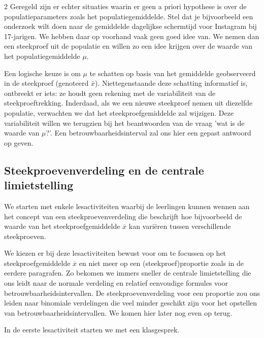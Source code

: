 \begin{multicols}{2}
Geregeld zijn er echter situaties waarin er geen a priori hypothese is over de populatieparameters zoals het populatiegemiddelde. Stel dat je bijvoorbeeld een onderzoek wilt doen naar de gemiddelde dagelijkse schermtijd voor Instagram bij 17-jarigen.  We hebben daar op voorhand vaak geen goed idee van. We nemen dan een steekproef uit de populatie en willen zo een idee krijgen over de waarde van het populatiegemiddelde $\mu$. %

Een logische keuze is om $\mu$ te schatten op basis van het gemiddelde geobserveerd in de steekproef (genoteerd $\bar{x}$). Niettegenstaande deze schatting informatief is, ontbreekt er iets: ze houdt geen rekening met de variabiliteit van de steekproeftrekking. Inderdaad, als we een nieuwe steekproef nemen uit diezelfde populatie, verwachten we dat het steekproefgemiddelde zal wijzigen. Deze variabiliteit willen we terugzien bij het beantwoorden van de vraag 'wat is de waarde van $\mu$?'. Een betrouwbaarheidsinterval zal ons hier een gepast antwoord op geven.

\subsection*{Steekproevenverdeling en de centrale limietstelling}
We starten met enkele lesactiviteiten waarbij de leerlingen kunnen wennen aan het concept van een steekproevenverdeling die beschrijft hoe bijvoorbeeld de waarde van het steekproefgemiddelde $\overline{x}$ kan vari\"eren tussen verschillende steekproeven. 

We kiezen er bij deze lesactiviteiten bewust voor om te focussen op het steekproefgemiddelde $\overline{x}$ en niet meer op een (steekproef)proportie zoals in de eerdere paragrafen. Zo bekomen we immers sneller de centrale limietstelling die ons leidt naar de normale verdeling en relatief eenvoudige formules voor betrouwbaarheidsintervallen. De steekproevenverdeling voor een proportie zou ons leiden naar binomiale verdelingen die veel minder geschikt zijn voor het opstellen van betrouwbaarheidsintervallen. We komen hier later nog even op terug.

In de eerste lesactiviteit starten we met een klasgesprek.
\end{multicols}

\clearpage


